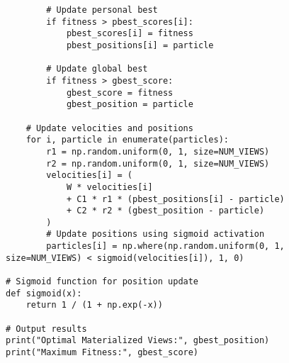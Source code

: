 \begin{verbatim}
        # Update personal best
        if fitness > pbest_scores[i]:
            pbest_scores[i] = fitness
            pbest_positions[i] = particle

        # Update global best
        if fitness > gbest_score:
            gbest_score = fitness
            gbest_position = particle

    # Update velocities and positions
    for i, particle in enumerate(particles):
        r1 = np.random.uniform(0, 1, size=NUM_VIEWS)
        r2 = np.random.uniform(0, 1, size=NUM_VIEWS)
        velocities[i] = (
            W * velocities[i]
            + C1 * r1 * (pbest_positions[i] - particle)
            + C2 * r2 * (gbest_position - particle)
        )
        # Update positions using sigmoid activation
        particles[i] = np.where(np.random.uniform(0, 1, size=NUM_VIEWS) < sigmoid(velocities[i]), 1, 0)

# Sigmoid function for position update
def sigmoid(x):
    return 1 / (1 + np.exp(-x))

# Output results
print("Optimal Materialized Views:", gbest_position)
print("Maximum Fitness:", gbest_score)

\end{verbatim}